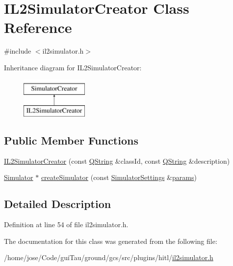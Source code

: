 \hypertarget{class_i_l2_simulator_creator}{\section{I\-L2\-Simulator\-Creator Class Reference}
\label{class_i_l2_simulator_creator}
}


{\ttfamily \#include $<$il2simulator.\-h$>$}

Inheritance diagram for I\-L2\-Simulator\-Creator\-:\begin{figure}[H]
\begin{center}
\leavevmode
\includegraphics[height=2.000000cm]{class_i_l2_simulator_creator}
\end{center}
\end{figure}
\subsection*{Public Member Functions}
\begin{DoxyCompactItemize}
\item 
\hyperlink{group__hitlplugin_ga48d82430e3d3b6b0cc8fb1ed921a5ad0}{I\-L2\-Simulator\-Creator} (const \hyperlink{group___u_a_v_objects_plugin_gab9d252f49c333c94a72f97ce3105a32d}{Q\-String} \&class\-Id, const \hyperlink{group___u_a_v_objects_plugin_gab9d252f49c333c94a72f97ce3105a32d}{Q\-String} \&description)
\item 
\hyperlink{class_simulator}{Simulator} $\ast$ \hyperlink{group__hitlplugin_gaea21540d2b8699f845b5a6969e5254ba}{create\-Simulator} (const \hyperlink{group___h_i_t_l_plugin_ga052199f1328d3002bce3e45345aa7f4e}{Simulator\-Settings} \&\hyperlink{glext_8h_afeb6390ab3bc8a0e96a88aff34d52288}{params})
\end{DoxyCompactItemize}


\subsection{Detailed Description}


Definition at line 54 of file il2simulator.\-h.



The documentation for this class was generated from the following file\-:\begin{DoxyCompactItemize}
\item 
/home/jose/\-Code/gui\-Tau/ground/gcs/src/plugins/hitl/\hyperlink{il2simulator_8h}{il2simulator.\-h}\end{DoxyCompactItemize}
